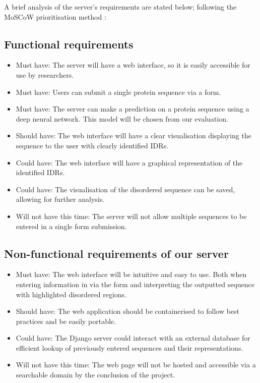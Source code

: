 \documentclass{l4proj}
\begin{document}
A brief analysis of the server’s requirements are stated below; following the MoSCoW prioritisation method \citep{moscow}: 
\label{chap:analysis sec:moscow}
\subsection{Functional requirements}

\begin{itemize}    
    \item Must have: The server will have a web interface, so it is easily accessible for use by researchers.
    \item Must have: Users can submit a single protein sequence via a form.
    \item Must have: The server can make a prediction on a protein sequence using a deep neural network. This model will be chosen from our evaluation.
    \item Should have: The web interface will have a clear visualisation displaying the sequence to the user with clearly identified IDRs.
    \item Could have: The web interface will have a graphical representation of the identified IDRs.
    \item Could have: The visualisation of the disordered sequence can be saved, allowing for further analysis.
    \item Will not have this time: The server will not allow multiple sequences to be entered in a single form submission.
\end{itemize}

\subsection{Non-functional requirements of our server}

\begin{itemize}    
    \item Must have: The web interface will be intuitive and easy to use. Both when entering information in via the form and interpreting the outputted sequence with highlighted disordered regions.
    \item Should have: The web application should be containerised to follow best practices and be easily portable.
    \item Could have: The Django server could interact with an external database for efficient lookup of previously entered sequences and their representations.
    \item Will not have this time: The web page will not be hosted and accessible via a searchable domain by the conclusion of the project.
\end{itemize}
\end{document}
